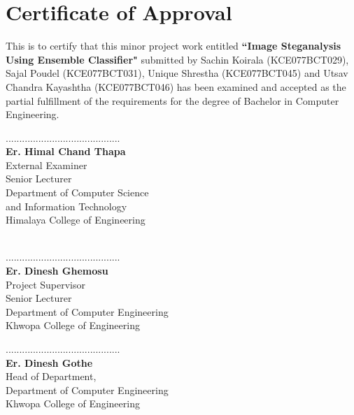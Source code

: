 \titleformat{\chapter}[display]{\normalfont\huge\bfseries\centering}{\chaptertitlename\ \thechapter}{20pt}{\Huge}
\chapter*{ Certificate of Approval}
	\vspace{1cm}
	This is to certify that this minor project work entitled \textbf{``Image Steganalysis Using Ensemble Classifier"} submitted by Sachin Koirala (KCE077BCT029), Sajal Poudel (KCE077BCT031), Unique Shrestha (KCE077BCT045) and Utsav Chandra Kayashtha (KCE077BCT046) has been examined and accepted as the partial fulfillment of the requirements for the degree of Bachelor in Computer Engineering.\\
	\vspace{1in}
	\begin{multicols}{2}
	  \begin{center}
		..........................................\\
		\textbf{Er. Himal Chand Thapa}\\
		External Examiner\\
		Senior Lecturer\\     
		Department of Computer Science\\ and Information Technology\\
		Himalaya College of Engineering\\
		\textbf{}\\
		
	  \end{center}
	
	\columnbreak
	  \begin{center}
		..........................................\\
		\textbf{Er. Dinesh Ghemosu}\\
		Project Supervisor\\
		Senior Lecturer\\
		Department of Computer Engineering\\
		Khwopa College of Engineering\\
		
	  \end{center}
	\end{multicols}
	\vspace{1in}
	\begin{center}
	  ..........................................\\
	  \textbf{Er. Dinesh Gothe}\\
	  Head of Department,\\
	  Department of Computer Engineering\\
	  Khwopa College of Engineering
	\end{center}